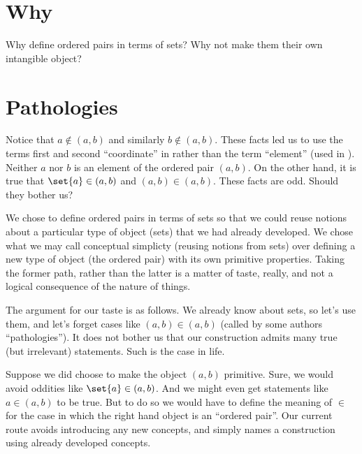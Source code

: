 

\section*{Why}

Why define ordered pairs in terms of sets?
Why not make them their own intangible object?

\section*{Pathologies}

Notice that $a \not\in (a, b)$ and similarly $b \not\in (a, b)$.
These facts led us to use the terms first and second ``coordinate'' in rather than the term ``element'' (used in ).
Neither $a$ nor $b$ is an element of the ordered pair $(a, b)$.
On the other hand, it is true that $\set{a} \in (a, b)$ and $(a, b) \in (a, b)$.
These facts are odd.
Should they bother us?

We chose to define ordered pairs in terms of sets so that we could reuse notions about a particular type of object (sets) that we had already developed.
We chose what we may call conceptual simplicty (reusing notions from sets) over defining a new type of object (the ordered pair) with its own primitive properties.
Taking the former path, rather than the latter is a matter of taste, really, and not a logical consequence of the nature of things.

The argument for our taste is as follows.
We already know about sets, so let's use them, and let's forget cases like $(a, b) \in (a, b)$ (called by some authors ``pathologies'').
It does not bother us that our construction admits many true (but irrelevant) statements.
Such is the case in life.

Suppose we did choose to make the object $(a, b)$ primitive.
Sure, we would avoid oddities like $\set{a} \in (a, b)$.
And we might even get statements like $a \in (a, b)$ to be true.
But to do so we would have to define the meaning of $\in$ for the case in which the right hand object is an ``ordered pair''.
Our current route avoids introducing any new concepts, and simply names a construction using already developed concepts.

\blankpage